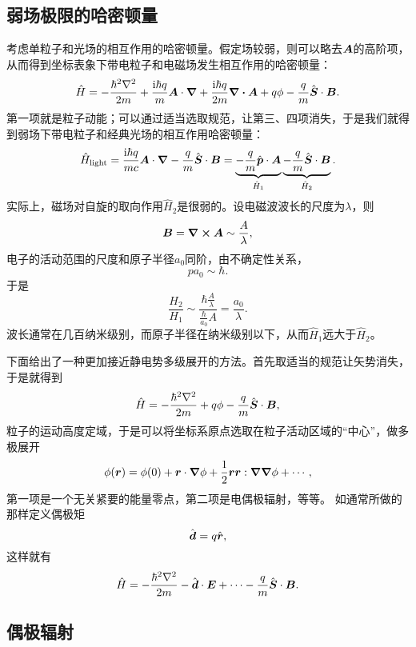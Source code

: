 \documentclass[UTF8, a4paper]{ctexart}
\newcommand*{\ii}{\mathrm{i}}
\begin{document}
\subsection{弱场极限的哈密顿量}

考虑单粒子和光场的相互作用的哈密顿量。假定场较弱，则可以略去$\vb*{A}$的高阶项，从而得到坐标表象下带电粒子和电磁场发生相互作用的哈密顿量：
\[
    \hat{H} = - \frac{\hbar^2 \laplacian}{2m} + \frac{\ii \hbar q}{m} \vb*{A} \cdot \grad + \frac{\ii \hbar q}{2 m} \div\vb*{A} + q \phi - \frac{q}{m} \hat{\vb*{S}} \cdot \vb*{B}.
\]
第一项就是粒子动能；可以通过适当选取规范，让第三、四项消失，于是我们就得到弱场下带电粒子和经典光场的相互作用哈密顿量：
\begin{equation}
    \hat{H}_\text{light} = \frac{\ii \hbar q}{m c} \vb*{A} \cdot \grad - \frac{q}{m} \hat{\vb*{S}} \cdot \vb*{B} = \underbrace{- \frac{q}{m} \hat{\vb*{p}} \cdot \vb*{A}}_{\hat{H}_\text{1}} \underbrace{- \frac{q}{m} \hat{\vb*{S}} \cdot \vb*{B}}_{\hat{H}_2}.
\end{equation}
实际上，磁场对自旋的取向作用$\hat{H}_2$是很弱的。设电磁波波长的尺度为$\lambda$，则
\[
    \vb*{B} = \curl{\vb*{A}} \sim \frac{A}{\lambda},
\]
电子的活动范围的尺度和原子半径$a_0$同阶，由不确定性关系，
\[
    p a_0 \sim \hbar.
\]
于是
\[
    \frac{H_2}{H_1} \sim \frac{\hbar \frac{A}{\lambda}}{\frac{\hbar}{a_0} A} = \frac{a_0}{\lambda}.
\]
波长通常在几百纳米级别，而原子半径在纳米级别以下，从而$\hat{H}_1$远大于$\hat{H}_2$。

下面给出了一种更加接近静电势多级展开的方法。首先取适当的规范让矢势消失，于是就得到
\[
    \hat{H} = - \frac{\hbar^2 \laplacian}{2m} + q \phi - \frac{q}{m} \hat{\vb*{S}} \cdot \vb*{B},
\]
粒子的运动高度定域，于是可以将坐标系原点选取在粒子活动区域的“中心”，做多极展开
\[
    \phi(\vb*{r}) = \phi(0) + \vb*{r} \cdot \grad{\phi} + \frac{1}{2} \vb*{r} \vb*{r} : \grad{\grad{\phi}} + \cdots,
\]
第一项是一个无关紧要的能量零点，第二项是电偶极辐射，等等。
如通常所做的那样定义偶极矩
\begin{equation}
    \hat{\vb*{d}} = q \hat{\vb*{r}},
\end{equation}
这样就有
\begin{equation}
    \hat{H} = - \frac{\hbar^2 \laplacian}{2m} - \hat{\vb*{d}} \cdot \vb*{E} + \cdots - \frac{q}{m} \hat{\vb*{S}} \cdot \vb*{B}.
\end{equation}

\subsection{偶极辐射}
\end{document}

